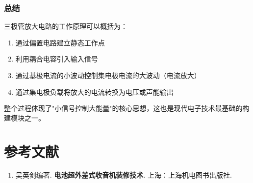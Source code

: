\documentclass[12pt,UTF8]{ctexbook}
\begin{document}
\subsection{总结}

三极管放大电路的工作原理可以概括为：

\begin{enumerate}[leftmargin=2cm]
	\item 通过偏置电路建立静态工作点
	\item 利用耦合电容引入输入信号
	\item 通过基极电流的小波动控制集电极电流的大波动（电流放大）
	\item 通过集电极负载将放大的电流转换为电压或声能输出
\end{enumerate}

整个过程体现了"小信号控制大能量"的核心思想，这也是现代电子技术最基础的构建模块之一。


\backmatter

\chapter{参考文献}

\begin{enumerate}
	\item 吴英剑编著. \textbf{电池超外差式收音机装修技术}. 上海：上海机电图书出版社.
\end{enumerate}
\end{document}
